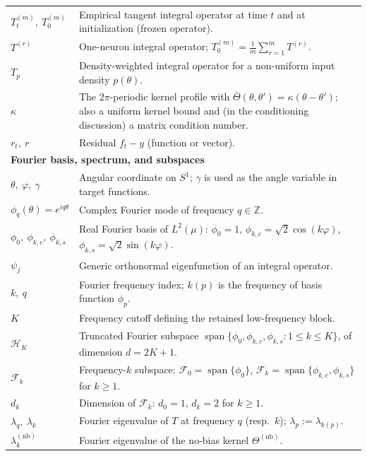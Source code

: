 \begin{longtable}{p{} p{}}
$T_t^{(m)},\ T_0^{(m)}$ & Empirical tangent integral operator at time $t$ and at initialization (frozen operator). \\[0.4em]
$T^{(r)}$ & One-neuron integral operator; $T_0^{(m)}=\tfrac1m\sum_{r=1}^m T^{(r)}$. \\[0.4em]
$T_p$ & Density-weighted integral operator for a non-uniform input density $p(\theta)$. \\[0.4em]
$\kappa$ & The $2\pi$-periodic kernel profile with $\bar\Theta(\theta,\theta')=\kappa(\theta-\theta')$; also a uniform kernel bound and (in the conditioning discussion) a matrix condition number. \\[0.4em]
$r_t,\ r$ & Residual $f_t-y$ (function or vector). \\[0.6em]

\multicolumn{2}{l}{\textbf{Fourier basis, spectrum, and subspaces}}\\[0.3em]
$\theta,\ \varphi,\ \gamma$ & Angular coordinate on $S^1$; $\gamma$ is used as the angle variable in target functions. \\[0.4em]
$\phi_q(\theta)=e^{iq\theta}$ & Complex Fourier mode of frequency $q\in\mathbb{Z}$. \\[0.4em]
$\phi_0,\ \phi_{k,c},\ \phi_{k,s}$ & Real Fourier basis of $L^2(\mu)$: $\phi_0=1$, $\phi_{k,c}=\sqrt{2}\cos(k\varphi)$, $\phi_{k,s}=\sqrt{2}\sin(k\varphi)$. \\[0.4em]
$\psi_j$ & Generic orthonormal eigenfunction of an integral operator. \\[0.4em]
$k,\ q$ & Fourier frequency index; $k(p)$ is the frequency of basis function $\phi_p$. \\[0.4em]
$K$ & Frequency cutoff defining the retained low-frequency block. \\[0.4em]
$\mathcal{H}_K$ & Truncated Fourier subspace $\operatorname{span}\{\phi_0,\phi_{k,c},\phi_{k,s}:1\le k\le K\}$, of dimension $d=2K+1$. \\[0.4em]
$\mathcal{F}_k$ & Frequency-$k$ subspace: $\mathcal{F}_0=\operatorname{span}\{\phi_0\}$, $\mathcal{F}_k=\operatorname{span}\{\phi_{k,c},\phi_{k,s}\}$ for $k\ge1$. \\[0.4em]
$d_k$ & Dimension of $\mathcal{F}_k$: $d_0=1$, $d_k=2$ for $k\ge1$. \\[0.4em]
$\lambda_q,\ \lambda_k$ & Fourier eigenvalue of $T$ at frequency $q$ (resp.\ $k$); $\lambda_p:=\lambda_{k(p)}$. \\[0.4em]
$\lambda_k^{(\mathrm{nb})}$ & Fourier eigenvalue of the no-bias kernel $\Theta^{(\mathrm{nb})}$. \\[0.4em]

\end{longtable}
